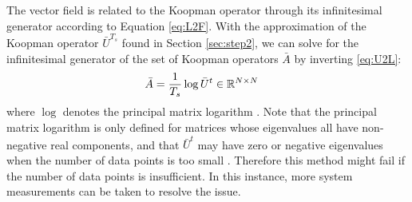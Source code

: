 The vector field is related to the Koopman operator through its infinitesimal generator according to Equation \eqref{eq:L2F}.
With the approximation of the Koopman operator $\bar{U}^{T_s}$ found in Section \ref{sec:step2}, we can solve for the infinitesimal generator of the set of Koopman operators $\bar{A}$ by inverting \eqref{eq:U2L}:
\begin{align}
    \bar{A} &= \frac{1}{T_s} \log{ \bar{U}^t } \in \mathbb{R}^{N \times N}
    \label{eq:logU}
\end{align}
where $\log$ denotes the principal matrix logarithm \cite[Chapter 11]{higham2008functions}.
Note that the principal matrix logarithm is only defined for matrices whose eigenvalues all have non-negative real components, and that $\bar{U}^t$ may have zero or negative eigenvalues when the number of data points is too small \cite{mauroy2016linear}.
Therefore this method might fail if the number of data points is insufficient.
In this instance, more system measurements can be taken to resolve the issue.

